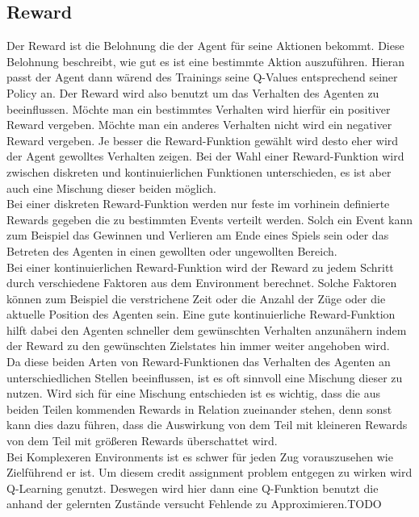\subsection{Reward}
Der Reward ist die Belohnung die der Agent für seine Aktionen bekommt. Diese Belohnung beschreibt, wie gut es ist eine bestimmte Aktion auszuführen. Hieran passt der Agent dann wärend des Trainings seine Q-Values entsprechend seiner Policy an. Der Reward wird also benutzt um das Verhalten des Agenten zu beeinflussen. Möchte man ein bestimmtes Verhalten wird hierfür ein positiver Reward vergeben. Möchte man ein anderes Verhalten nicht wird ein negativer Reward vergeben. Je besser die  Reward-Funktion gewählt wird desto eher wird der Agent gewolltes Verhalten zeigen. Bei der Wahl einer Reward-Funktion wird zwischen diskreten und  kontinuierlichen Funktionen unterschieden, es ist aber auch eine Mischung dieser beiden möglich.\\
Bei einer diskreten Reward-Funktion werden nur feste im vorhinein definierte Rewards gegeben die zu bestimmten Events verteilt werden. Solch ein Event kann zum Beispiel das Gewinnen und Verlieren am Ende eines Spiels sein oder das Betreten des Agenten in einen gewollten oder ungewollten Bereich. \\
Bei einer kontinuierlichen Reward-Funktion wird der Reward zu jedem Schritt durch verschiedene Faktoren aus dem Environment berechnet. Solche Faktoren können zum Beispiel die verstrichene Zeit oder die Anzahl der Züge oder die aktuelle Position des Agenten sein. Eine gute kontinuierliche Reward-Funktion hilft dabei den Agenten schneller dem gewünschten Verhalten anzunähern indem der Reward zu den gewünschten Zielstates hin immer weiter angehoben wird.\\ 
Da diese beiden Arten von Reward-Funktionen das Verhalten des Agenten an unterschiedlichen Stellen beeinflussen, ist es oft sinnvoll eine Mischung dieser zu nutzen.
Wird sich für eine Mischung entschieden ist es wichtig, dass die aus beiden Teilen kommenden Rewards in Relation zueinander stehen, denn sonst kann dies dazu führen, dass die Auswirkung von dem Teil mit kleineren Rewards von dem Teil mit größeren Rewards überschattet wird.\\

Bei Komplexeren Environments ist es schwer für jeden Zug vorauszusehen wie Zielführend er ist. Um diesem credit assignment problem entgegen zu wirken wird Q-Learning genutzt.
Deswegen wird hier dann eine Q-Funktion benutzt die anhand der gelernten Zustände versucht Fehlende zu Approximieren.\colorbox{red!30}{TODO}

